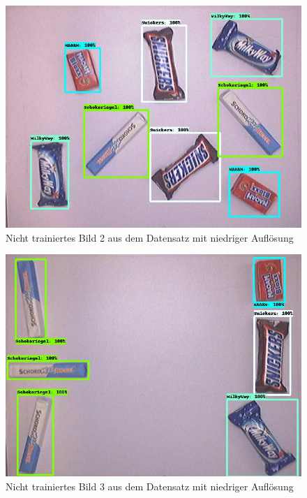     \begin{figure}[H]
        \centering
        \includegraphics[angle = 90, width = \textwidth]{Bilder/models/model_comparison/faster_rcnn_inception_resnet_v2_640x640_coco17_tpu-8/non_trained_2.jpg}
        \caption{Nicht trainiertes Bild 2 aus dem Datensatz mit niedriger Auflösung}
    \end{figure}
    
    \begin{figure}[H]
        \centering
        \includegraphics[angle = 90, width = \textwidth]{Bilder/models/model_comparison/faster_rcnn_inception_resnet_v2_640x640_coco17_tpu-8/non_trained_3.jpg}
        \caption{Nicht trainiertes Bild 3 aus dem Datensatz mit niedriger Auflösung}
    \end{figure}
    
